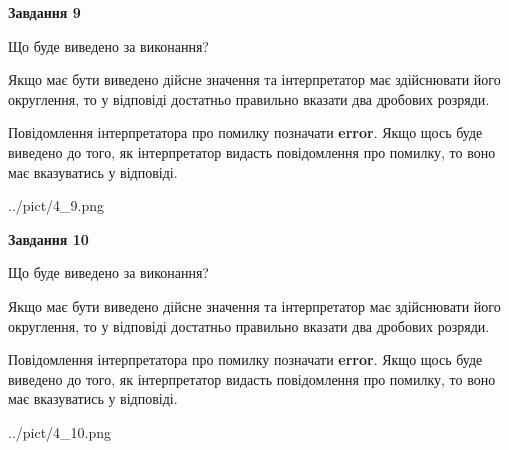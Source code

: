\documentclass[12pt, ukrainian]{article}
\begin{document}
{\begin {Large}
{\begin {center}\textbf{Завдання 9}\end {center}}\par
Що буде виведено за виконання? \par

Якщо має бути виведено дійсне значення та інтерпретатор має здійснювати його округлення, 
то у відповіді достатньо правильно вказати два дробових розряди.

Повідомлення інтерпретатора про помилку позначати \textbf{error}.
Якщо щось буде виведено до того, як інтерпретатор видасть повідомлення про помилку, 
то воно має вказуватись у відповіді. \par

\begin{center}
	{../pict/4_9.png}
\end{center}
\newpage

{\begin {center}\textbf{Завдання 10}\end {center}}\par
Що буде виведено за виконання? \par

Якщо має бути виведено дійсне значення та інтерпретатор має здійснювати його округлення, 
то у відповіді достатньо правильно вказати два дробових розряди.

Повідомлення інтерпретатора про помилку позначати \textbf{error}.
Якщо щось буде виведено до того, як інтерпретатор видасть повідомлення про помилку, 
то воно має вказуватись у відповіді. \par

\begin{center}
	{../pict/4_10.png}
\end{center}
\newpage

\end {Large}}
\end{document}
